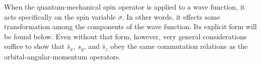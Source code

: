 When the quantum-mechanical spin operator is applied to a wave function, it
acts specifically on the spin variable $\sigma$. In other words, it effects
some transformation among the components of the wave function. Its explicit
form will be found below. Even without that form, however, very general
considerations suffice to show that $\hat s_x$, $\hat s_y$, and $\hat s_z$
obey the same commutation relations as the orbital-angular-momentum
operators.
